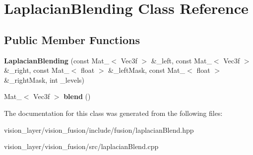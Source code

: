 \hypertarget{classLaplacianBlending}{}\section{Laplacian\+Blending Class Reference}
\label{classLaplacianBlending}
\subsection*{Public Member Functions}
\begin{DoxyCompactItemize}
\item 
\mbox{\label{classLaplacianBlending_a49d7f455a4c06eee3b8a0f328f6d7030}} 
{\bfseries Laplacian\+Blending} (const Mat\+\_\+$<$ Vec3f $>$ \&\+\_\+left, const Mat\+\_\+$<$ Vec3f $>$ \&\+\_\+right, const Mat\+\_\+$<$ float $>$ \&\+\_\+left\+Mask, const Mat\+\_\+$<$ float $>$ \&\+\_\+right\+Mask, int \+\_\+levels)
\item 
\mbox{\label{classLaplacianBlending_aa700402157dc7ed848724f6edd0b5d4e}} 
Mat\+\_\+$<$ Vec3f $>$ {\bfseries blend} ()
\end{DoxyCompactItemize}


The documentation for this class was generated from the following files\+:\begin{DoxyCompactItemize}
\item 
vision\+\_\+layer/vision\+\_\+fusion/include/fusion/laplacian\+Blend.\+hpp\item 
vision\+\_\+layer/vision\+\_\+fusion/src/laplacian\+Blend.\+cpp\end{DoxyCompactItemize}
